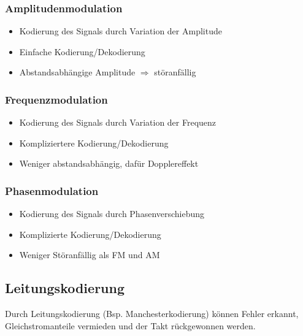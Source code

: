 \documentclass[a4paper]{article}
\begin{document}
\subsubsection{Amplitudenmodulation}
\begin{itemize}
    \item Kodierung des Signals durch Variation der Amplitude
    \item Einfache Kodierung/Dekodierung
    \item Abstandsabhängige Amplitude $\Rightarrow$ störanfällig
\end{itemize}

\subsubsection{Frequenzmodulation}
\begin{itemize}
    \item Kodierung des Signals durch Variation der Frequenz
    \item Kompliziertere Kodierung/Dekodierung
    \item Weniger abstandsabhängig, dafür Dopplereffekt
\end{itemize}

\subsubsection{Phasenmodulation}
\begin{itemize}
    \item Kodierung des Signals durch Phasenverschiebung
    \item Komplizierte Kodierung/Dekodierung
    \item Weniger Störanfällig als FM und AM
\end{itemize}

\subsection{Leitungskodierung}
Durch Leitungskodierung (Bsp. Manchesterkodierung) können Fehler erkannt, Gleichstromanteile vermieden und der Takt rückgewonnen werden.
\end{document}
